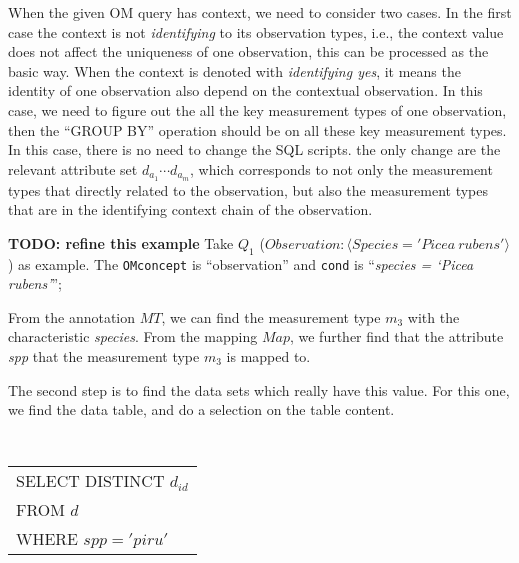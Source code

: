 When the given OM query has context, we need to consider two cases.
In the first case the context is not {\em identifying} to its
observation types, i.e., the context value
does not affect the uniqueness of one observation, this can be
processed as the basic way.
When the context is denoted with {\em identifying yes}, it means the
identity of one observation also depend on the contextual
observation.
In this case, we need to figure out the all the key measurement types
of one observation, then the ``GROUP BY'' operation should be on all
these key measurement types.
In this case, there is no need to change the SQL scripts.
the only change are the relevant attribute set $d_{a_1} \cdots
d_{a_m}$, which corresponds to not only the measurement types that
directly related to the observation, but also the measurement types
that are in the identifying context chain of the observation.



\begin{example}\label{eg:query_reqerite_q1}
{\bf TODO: refine this example}
Take $Q_1$ ($Observation: \langle Species='Picea~rubens'\rangle$) as
example.
The {\tt OMconcept} is ``observation'' and {\tt cond} is ``{\em species = `Picea rubens'}'';

From the annotation $MT$, we can find the measurement type
$m_3$ with the characteristic {\em species}.
From the mapping $Map$, we further find that the attribute {\em spp} that the
measurement type $m_3$ is mapped to.

The second step is to find the data sets which really have this value.
For this one, we find the data table, and do a selection on the table
content.

\vspace{0.1in}
{\tt
\begin{tabular}{l}
SELECT DISTINCT $d_{id}$\\
FROM $d$\\
WHERE $spp = 'piru'$
\end{tabular}
}
\vspace{0.1in}

\end{example}

